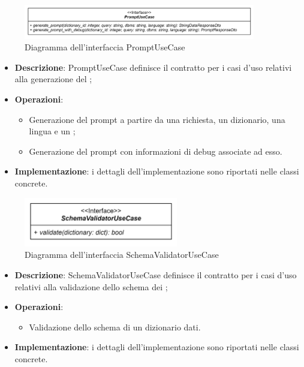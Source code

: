 \label{PromptUseCase}
\begin{figure}[H]
    \centering
    \includegraphics[width=0.9\textwidth]{assets/Backend/prompt_use_case.png}
    \caption{Diagramma dell'interfaccia PromptUseCase}
  \end{figure}
\begin{itemize}
    \item \textbf{Descrizione}: PromptUseCase definisce il contratto per i casi d'uso relativi alla generazione del ;
    \item \textbf{Operazioni}:
    \begin{itemize}
      \item Generazione del prompt a partire da una richiesta, un dizionario, una lingua e un ;
      \item Generazione del prompt con informazioni di debug associate ad esso.
    \end{itemize}
    \item \textbf{Implementazione}: i dettagli dell'implementazione sono riportati nelle classi concrete.
\end{itemize}  

 \label{SchemaValidatorUseCase}
\begin{figure}[H]
    \centering
    \includegraphics[width=0.6\textwidth]{assets/Backend/schema_validator_use_case.png}
    \caption{Diagramma dell'interfaccia SchemaValidatorUseCase}
  \end{figure}
\begin{itemize}
    \item \textbf{Descrizione}: SchemaValidatorUseCase definisce il contratto per i casi d'uso relativi alla validazione dello schema dei ;
    \item \textbf{Operazioni}:
    \begin{itemize}
      \item Validazione dello schema di un dizionario dati.
    \end{itemize}
    \item \textbf{Implementazione}: i dettagli dell'implementazione sono riportati nelle classi concrete.
\end{itemize}  

